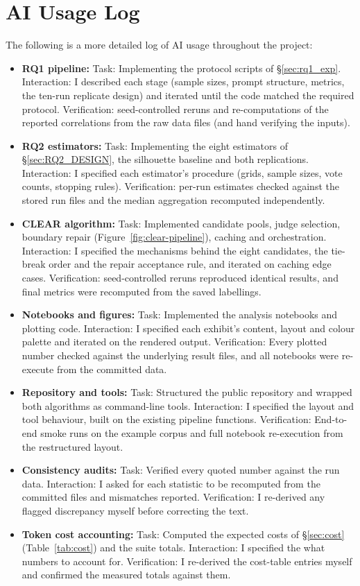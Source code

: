 \documentclass[11pt,a4paper,oneside]{report}
\begin{document}
\section*{AI Usage Log}

The following is a more detailed log of AI usage throughout the project:

\begin{itemize}
\item \textbf{RQ1 pipeline:} Task: Implementing the protocol scripts of \S\ref{sec:rq1_exp}.
Interaction: I described each stage (sample sizes, prompt structure, metrics,
the ten-run replicate design) and iterated until the code matched the
required protocol. Verification: seed-controlled reruns and re-computations of the
reported correlations from the raw data files (and hand verifying the inputs).
\item \textbf{RQ2 estimators:} Task: Implementing the eight estimators of \S\ref{sec:RQ2_DESIGN}, the
silhouette baseline and both replications. Interaction: I specified each
estimator's procedure (grids, sample sizes, vote counts, stopping rules).
Verification: per-run estimates checked against the stored run files and the
median aggregation recomputed independently.
\item \textbf{CLEAR algorithm:} Task: Implemented candidate pools, judge
selection, boundary repair (Figure~\ref{fig:clear-pipeline}), caching and orchestration. Interaction: I
specified the mechanisms behind the eight candidates, the tie-break order and the repair acceptance
rule, and iterated on caching edge cases. Verification: seed-controlled reruns
reproduced identical results, and final metrics were recomputed from the saved
labellings.
\item \textbf{Notebooks and figures:} Task: Implemented the analysis notebooks
and plotting code. Interaction: I specified each exhibit's content, layout
and colour palette and iterated on the rendered output. Verification: Every
plotted number checked against the underlying result files, and all notebooks were 
re-execute from the committed data.
\item \textbf{Repository and tools:} Task: Structured the public repository and
wrapped both algorithms as command-line tools. Interaction: I specified the
layout and tool behaviour, built on the existing pipeline functions.
Verification: End-to-end smoke runs on the example corpus and full notebook
re-execution from the restructured layout.
\item \textbf{Consistency audits:} Task: Verified every quoted number against
the run data. Interaction: I asked for each statistic to be recomputed from
the committed files and mismatches reported. Verification: I re-derived any
flagged discrepancy myself before correcting the text.
\item \textbf{Token cost accounting:} Task: Computed the expected costs of
\S\ref{sec:cost} (Table~\ref{tab:cost}) and the suite totals. Interaction: I specified the what numbers to account for. Verification: I re-derived the
cost-table entries myself and confirmed the measured totals against them.

\end{itemize}
\end{document}
